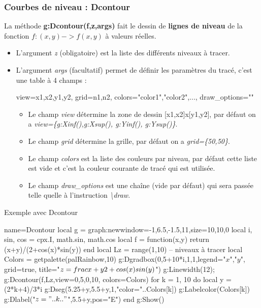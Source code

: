 \subsubsection{Courbes de niveau : Dcontour}

La méthode \textbf{g:Dcontour(f,z,args)} fait le dessin de \textbf{lignes de niveau} de la fonction \(f: (x,y) -> f(x,y)\) à valeurs réelles.

\begin{itemize}
  \item L'argument \emph{z} (obligatoire) est la liste des différents niveaux à tracer.
  \item L'argument \emph{args} (facultatif) permet de définir les paramètres du tracé, c'est une table à 4 champs :
  
  \begin{TeXcode}
    { view={x1,x2,y1,y2}, grid={n1,n2}, colors={"color1","color2",...}, draw_options="" }
  \end{TeXcode}

    \begin{itemize}
        \item Le champ \emph{view} détermine la zone de dessin {[}x1,x2{]}x{[}y1,y2{]}, par défaut on a \emph{view=\{g:Xinf(),g:Xsup(), g:Yinf(), g:Ysup()\}}.
        \item Le champ \emph{grid} détermine la grille, par défaut on a \emph{grid=\{50,50\}}.
        \item Le champ \emph{colors} est la liste des couleurs par niveau, par défaut cette liste est vide et c'est la couleur courante de tracé qui est utilisée.
        \item Le champ \emph{draw\_options} est une chaîne (vide par défaut) qui sera passée telle quelle à l'instruction \emph{\textbackslash draw}.
    \end{itemize}
\end{itemize}

\begin{demo}{Exemple avec Dcontour}
\begin{luadraw}{name=Dcontour}
local g = graph:new{window={-1,6.5,-1.5,11},size={10,10,0}}
local i, sin, cos = cpx.I, math.sin, math.cos
local f = function(x,y) return (x+y)/(2+cos(x)*sin(y)) end
local Lz = range(1,10) -- niveaux à tracer
local Colors = getpalette(palRainbow,10)
g:Dgradbox({0,5+10*i,1,1},{legend={"$x$","$y$"}, grid=true, title="$z=\\frac{x+y}{2+\\cos(x)\\sin(y)}$"})
g:Linewidth(12); g:Dcontour(f,Lz,{view={0,5,0,10}, colors=Colors})
for k = 1, 10 do
    local y = (2*k+4)/3*i
    g:Dseg({5.25+y,5.5+y},1,"color="..Colors[k])
    g:Labelcolor(Colors[k])
    g:Dlabel("$z="..k.."$",5.5+y,{pos="E"})
end
g:Show()
\end{luadraw}
\end{demo}

